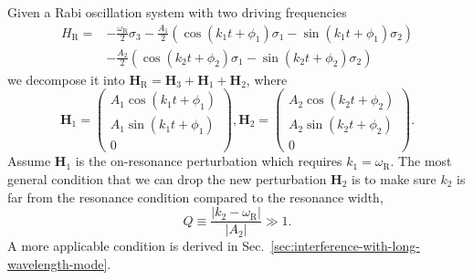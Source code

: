 \documentclass[%
reprint,
 amsmath,amssymb,
 aps,
]{revtex4-1}
\begin{document}
Given a Rabi oscillation system with two driving frequencies
\begin{align*}
    H_{\mathrm R} =& -\frac{\omega_{\mathrm R}}{2}\sigma_3 - \frac{A_{1} }{2}  \left( \cos(k_{1} t +\phi_{1})\sigma_1  - \sin(k_{1} t +\phi_{1}) \sigma_2\right) \nonumber\\
    & - \frac{A_{2} }{2}  \left( \cos(k_{2} t +\phi_{2})\sigma_1  - \sin(k_{2} t +\phi_{2}) \sigma_2\right)
\end{align*}
we decompose it into $\mathbf{H}_{\mathrm R}=\mathbf{H}_3 + \mathbf{H}_{1} + \mathbf{H}_2$, where
\begin{equation*}
    \mathbf{H}_1 =  \begin{pmatrix}
     A_{1} \cos(k_{1}t+\phi_{1}) \\
     A_{1} \sin(k_{1}t+\phi_{1})  \\
     0
      \end{pmatrix},   \mathbf{H}_2 =  \begin{pmatrix}
     A_{2} \cos(k_{2}t+\phi_{2}) \\
     A_{2} \sin(k_{2}t+\phi_{2})  \\
     0
      \end{pmatrix}.
\end{equation*}
Assume $\mathbf{H}_1$ is the on-resonance perturbation which requires $k_1 = \omega_{\mathrm{R}}$. The most general condition that we can drop the new perturbation $\mathbf{H}_2$ is to make sure $k_2$ is far from the resonance condition compared to the resonance width,
\begin{equation}
Q \equiv \frac{\lvert k_2 -\omega_{\mathrm R}\rvert}{\lvert A_2\rvert} \gg 1.
\end{equation}
A more applicable condition is derived in Sec.~\ref{sec:interference-with-long-wavelength-mode}.




 



\end{document}

